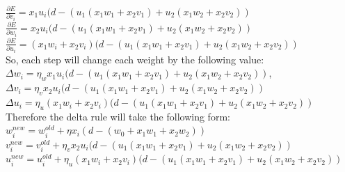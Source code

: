 \documentclass[a4paper, 12pt]{article}
\begin{document}
$\frac{\partial E}{\partial v_i} = x_1u_i(d - (u_1(x_1w_1 + x_2v_1) + u_2(x_1w_2 + x_2v_2))$\\

$\frac{\partial E}{\partial w_i} = x_2u_i(d - (u_1(x_1w_1 + x_2v_1) + u_2(x_1w_2 + x_2v_2))$\\

$\frac{\partial E}{\partial u_i} = (x_1w_i + x_2v_i)(d - (u_1(x_1w_1 + x_2v_1) + u_2(x_1w_2 + x_2v_2))$\\

So, each step will change each weight by the following value:\\

$\Delta w_i = \eta_w x_1u_i(d - (u_1(x_1w_1 + x_2v_1) + u_2(x_1w_2 + x_2v_2))$,\\
$\Delta v_i = \eta_v x_2u_i(d - (u_1(x_1w_1 + x_2v_1) + u_2(x_1w_2 + x_2v_2))$\\
$\Delta u_i = \eta_u (x_1w_i + x_2v_i)(d - (u_1(x_1w_1 + x_2v_1) + u_2(x_1w_2 + x_2v_2))$\\

Therefore the delta rule will take the following form:\\

$w_i^{new} = w_i^{old} + \eta x_i(d - (w_0 + x_1w_1 + x_2w_2))$\\
$v_i^{new} = v_i^{old} + \eta_v x_2u_i(d - (u_1(x_1w_1 + x_2v_1) + u_2(x_1w_2 + x_2v_2))$\\
$u_i^{new} = u_i^{old} + \eta_u (x_1w_i + x_2v_i)(d - (u_1(x_1w_1 + x_2v_1) + u_2(x_1w_2 + x_2v_2))$\\
\end{document}
